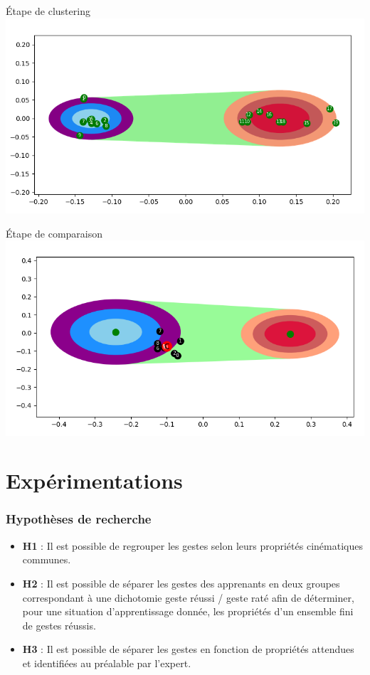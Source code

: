 \documentclass[svgnames]{beamer}
\begin{document}
	\begin{frame}{Étape de clustering}
	\centering
		\includegraphics[scale=0.5]{img/feedback_expert_cluster_example.png}
	\end{frame}
	
	\begin{frame}{Étape de comparaison}
	\centering
		\includegraphics[scale=0.4]{img/feedback_one.png}
	\end{frame}


	\part{Expérimentations}
	\section{Hypothèses de recherche}
	\begin{frame}{\secname}
		\begin{itemize}[label=$-$]
			\item \textbf{H1} : Il est possible de regrouper les gestes selon leurs propriétés cinématiques communes.
			\item \textbf{H2} : Il est possible de séparer les gestes des apprenants en deux groupes correspondant à une dichotomie geste réussi / geste raté afin de déterminer, pour une situation d'apprentissage donnée, les propriétés d'un ensemble fini de gestes réussis.
			\item \textbf{H3} : Il est possible de séparer les gestes en fonction de propriétés attendues et identifiées au préalable par l'expert.
		\end{itemize}
	\end{frame}
	
\end{document}
